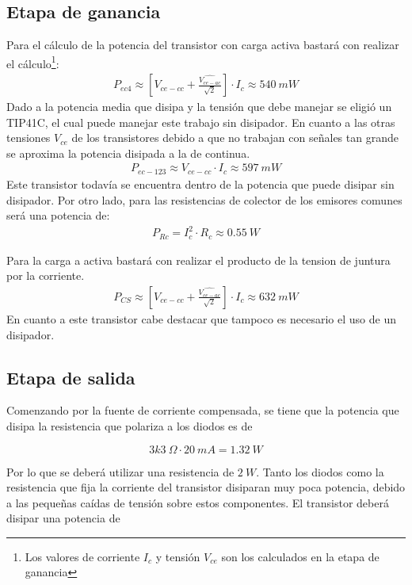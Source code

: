 \subsection{Etapa de ganancia}
Para el cálculo de la potencia del transistor con carga activa bastará con realizar el cálculo\footnote{Los valores de corriente $I_c$ y tensión $V_{ce}$ son los calculados en la etapa de ganancia}:
\begin{align}
P_{ec4}\approx\left[V_{ce-cc} + \frac{\hat{V_{ce-ac}}}{\sqrt{2}}\right]\cdot I_c\approx 540 \ mW
\end{align}
Dado a la potencia media que disipa y la tensión que debe manejar se eligió un TIP41C, el cual puede manejar este trabajo sin disipador.
En cuanto a las otras tensiones $V_{ce}$ de los transistores debido a que no trabajan con señales tan grande se aproxima la potencia disipada a la de continua.
\begin{align}
P_{ec-123}\approx V_{ce-cc} \cdot I_c \approx 597 \ mW
\end{align}
Este transistor todavía se encuentra dentro de la potencia que puede disipar sin disipador.
Por otro lado, para las resistencias de colector de los emisores comunes será una potencia de:
\begin{align}
P_{Rc}= I_c^2 \cdot R_c \approx 0.55 \ W
\end{align}

Para la carga a activa bastará con realizar el producto de la tension de juntura por la corriente.
\begin{align}
P_{CS}\approx\left[V_{ce-cc} + \frac{\hat{V_{ce-ac}}}{\sqrt{2}}\right]\cdot I_c\approx  632\ mW
\end{align}
En cuanto a este transistor cabe destacar que tampoco es necesario el uso de un disipador.
\subsection{Etapa de salida}

Comenzando por la fuente de corriente compensada, se tiene que la potencia que disipa la resistencia que polariza a los diodos es de

\begin{equation}
3k3 \ \Omega \cdot 20 \ mA = 1.32 \ W
\end{equation}

Por lo que se deberá utilizar una resistencia de $2 \ W$. Tanto los diodos como la resistencia que fija la corriente del transistor disiparan muy poca potencia, debido a las pequeñas caídas de tensión sobre estos componentes. El transistor deberá disipar una potencia de

